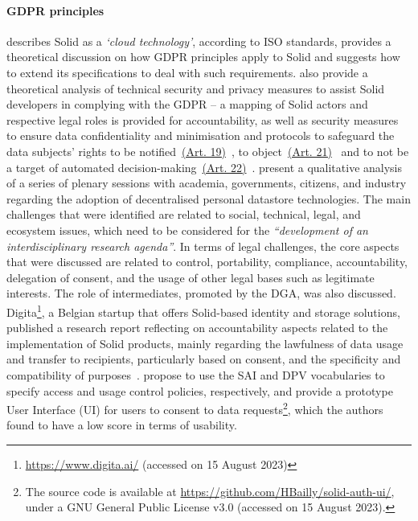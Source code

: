 \paragraph{GDPR principles}
\cite{pandit_making_2023} describes Solid as a \textit{`cloud technology'}, according to ISO standards, provides a theoretical discussion on how GDPR principles apply to Solid and suggests how to extend its specifications to deal with such requirements.
\cite{esposito_assessing_2023} also provide a theoretical analysis of technical security and privacy measures to assist Solid developers in complying with the GDPR -- a mapping of Solid actors and respective legal roles is provided for accountability, as well as security measures to ensure data confidentiality and minimisation and protocols to safeguard the data subjects' rights to be notified~\hyperref[art:19]{(Art. 19)}~\citeyearpar{noauthor_regulation_2016}, to object~\hyperref[art:21]{(Art. 21)}~\citeyearpar{noauthor_regulation_2016} and to not be a target of automated decision-making~\hyperref[art:22]{(Art. 22)}~\citeyearpar{noauthor_regulation_2016}.
\cite{van_damme_towards_2022} present a qualitative analysis of a series of plenary sessions with academia, governments, citizens, and industry regarding the adoption of decentralised personal datastore technologies. The main challenges that were identified are related to social, technical, legal, and ecosystem issues, which need to be considered for the \textit{``development of an interdisciplinary research agenda''}. In terms of legal challenges, the core aspects that were discussed are related to control, portability, compliance, accountability, delegation of consent, and the usage of other legal bases such as legitimate interests. The role of intermediates, promoted by the DGA, was also discussed. %
Digita\footnote{\url{https://www.digita.ai/} (accessed on 15 August 2023)}, a Belgian startup that offers Solid-based identity and storage solutions, published a research report reflecting on accountability aspects related to the implementation of Solid products, mainly regarding the lawfulness of data usage and transfer to recipients, particularly based on consent, and the specificity and compatibility of purposes~\citep{de_bot_data_2021}.
\cite{bailly_prototyping_2023} propose to use the SAI and DPV vocabularies to specify access and usage control policies, respectively, and provide a prototype User Interface (UI) for users to consent to data requests\footnote{The source code is available at \url{https://github.com/HBailly/solid-auth-ui/}, under a GNU General Public License v3.0 (accessed on 15 August 2023).}, which the authors found to have a low score in terms of usability.

